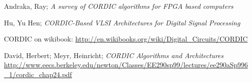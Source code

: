\documentclass[a4paper, 12pt, notitlepage]{report}
\begin{document}
\begin{thebibliography}{9}

  Andraka, Ray; \textit{A survey of CORDIC algorithms for FPGA based computers}

   Hu, Yu Hen; \textit{CORDIC-Based VLSI Architectures for Digital Signal Processing}

  CORDIC on wikibook: \url{http://en.wikibooks.org/wiki/Digital_Circuits/CORDIC}

   David, Herbert; Meyr, Heinricht; \textit{CORDIC Algorithms and Architectures} 
   \url{http://www.eecs.berkeley.edu/newton/Classes/EE290sp99/lectures/ee290aSp996_1/cordic_chap24.pdf}
\end{thebibliography}
\end{document}
